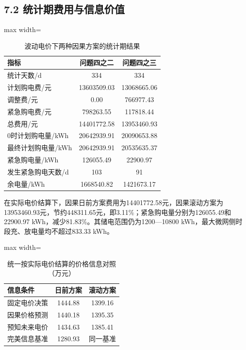 \documentclass[UTF8,a4paper,zihao=-4,fontset=windows]{ctexart}
\begin{document}
\subsection{7.2 统计期费用与信息价值}
\begin{table}[H]\centering
\fontsize{9.5}{12}\selectfont\setlength{\tabcolsep}{4pt}\renewcommand{\arraystretch}{1.12}
\begin{adjustbox}{max width=\linewidth}\begin{tabular}{lcc}\toprule
\textbf{指标} & \textbf{问题四之二} & \textbf{问题四之三}\\\midrule
统计天数/d & 334 & 334\\
计划购电费/元 & 13603509.03 & 13068665.06\\
调整费/元 & 0.00 & 766977.43\\
紧急购电费/元 & 798263.55 & 117818.44\\
总费用/元 & 14401772.58 & 13953460.93\\
0时计划购电量/kWh & 20642939.91 & 20090653.88\\
最终计划购电量/kWh & 20642939.91 & 20535635.37\\
紧急购电量/kWh & 126055.49 & 22900.97\\
发生紧急购电天数/d & 103 & 91\\
余电量/kWh & 1668540.82 & 1421673.17\\
\bottomrule\end{tabular}\end{adjustbox}
\caption{波动电价下两种因果方案的统计期结果}
\end{table}
在实际电价结算下，因果日前方案费用为14401772.58元，因果滚动方案为13953460.93元，节约448311.65元，即3.11\%；紧急购电量分别为126055.49和22900.97 kWh，减少81.83\%。其储电范围仍为1200—10800 kWh，最大微网侧时段充、放电量均不超过833.33 kWh。
\par
\begin{table}[H]\centering
\fontsize{9.5}{12}\selectfont\setlength{\tabcolsep}{4pt}\renewcommand{\arraystretch}{1.12}
\begin{adjustbox}{max width=\linewidth}\begin{tabular}{lcc}\toprule
\textbf{信息条件} & \textbf{日前方案} & \textbf{滚动方案}\\\midrule
固定电价决策 & 1444.88 & 1399.16\\
因果价格预测 & 1440.18 & 1395.35\\
预知未来电价 & 1434.63 & 1385.41\\
完美信息基准 & 1280.93 & 同一基准\\
\bottomrule\end{tabular}\end{adjustbox}
\caption{统一按实际电价结算的价格信息对照（万元）}
\end{table}
\end{document}
